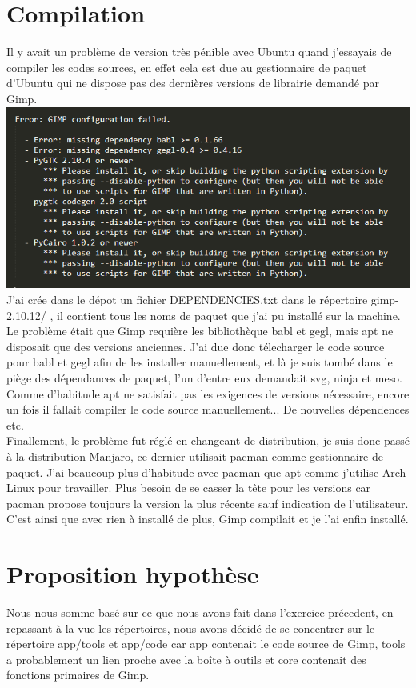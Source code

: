 \documentclass[12pt, letterpaper]{article}
\begin{document}
\section{Compilation}
Il y avait un problème de version très pénible avec Ubuntu quand j'essayais de compiler les codes sources, en effet cela est due au gestionnaire de paquet d'Ubuntu qui ne dispose pas des dernières versions de librairie demandé par Gimp.\\
\includegraphics[width=\linewidth]{c1.png}
J'ai crée dans le dépot un fichier DEPENDENCIES.txt dans le répertoire gimp-2.10.12/ , il contient tous les noms de paquet que j'ai pu installé sur la machine.\\
Le problème était que Gimp requière les bibliothèque babl et gegl, mais apt ne disposait que des versions anciennes.
J'ai due donc télecharger le code source pour babl et gegl afin de les installer manuellement, et là je suis tombé dans le piège des dépendances de paquet, l'un d'entre eux demandait svg, ninja et meso. Comme d'habitude apt ne satisfait pas les exigences de versions nécessaire, encore un fois il fallait compiler le code source manuellement... De nouvelles dépendences etc.\\
Finallement, le problème fut réglé en changeant de distribution, je suis donc passé à la distribution Manjaro, ce dernier utilisait pacman comme gestionnaire de paquet. J'ai beaucoup plus d'habitude avec pacman que apt comme j'utilise Arch Linux pour travailler. Plus besoin de se casser la tête pour les versions car pacman propose toujours la version la plus récente sauf indication de l'utilisateur.
C'est ainsi que avec rien à installé de plus, Gimp compilait et je l'ai enfin installé.

\section{Proposition hypothèse}
Nous nous somme basé sur ce que nous avons fait dans l'exercice précedent, en repassant à la vue les répertoires, nous avons décidé de se concentrer sur le répertoire app/tools et app/code car app contenait le code source de Gimp, tools a probablement un lien proche avec la boîte à outils et core contenait des fonctions primaires de Gimp.\\
\end{document}
